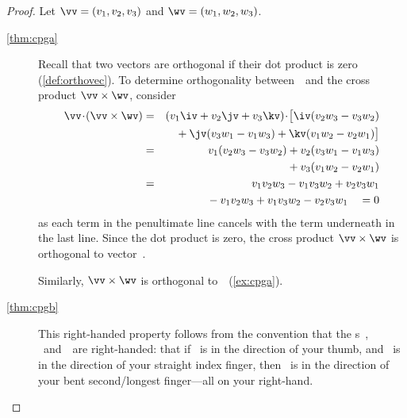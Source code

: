 \begin{proof} 
Let \(\vv=(v_1,v_2,v_3)\) and \(\wv=(w_1,w_2,w_3)\).
\begin{description}
\item[\ref{thm:cpga}] Recall that two vectors are orthogonal if their dot product is zero (\cref{def:orthovec}).
To determine orthogonality between~\vv\ and the cross product \(\vv\times\wv\), consider
\begin{eqnarray*}
\vv\cdot(\vv\times\wv)
&=&(v_1\iv+v_2\jv+v_3\kv)
\cdot\big[\iv(v_2w_3-v_3w_2)
\\&&{}
+\jv(v_3w_1-v_1w_3)
+\kv(v_1w_2-v_2w_1)\big]
\\&=&v_1(v_2w_3-v_3w_2)
+v_2(v_3w_1-v_1w_3)
\\&&{}
+v_3(v_1w_2-v_2w_1)
\\&=&v_1v_2w_3-v_1v_3w_2
+v_2v_3w_1
\\&&{}
-v_1v_2w_3
+v_1v_3w_2-v_2v_3w_1
\quad{}=0
\end{eqnarray*}
as each term in the penultimate line cancels with the term underneath in the last line.
Since the dot product is zero, the cross product \(\vv\times\wv\) is orthogonal to vector~\vv.

Similarly, \(\vv\times\wv\) is orthogonal to~\wv\  (\cref{ex:cpga}).

\item[\ref{thm:cpgb}] This right-handed property follows from the convention that the s~\iv, \jv\ and~\kv\ are right-handed: that if \iv~is in the direction of your thumb, and \jv~is in the direction of your straight index finger, then \kv~is in the direction of your bent second\slash longest finger---all on your right-hand.


\end{description}
\end{proof}

